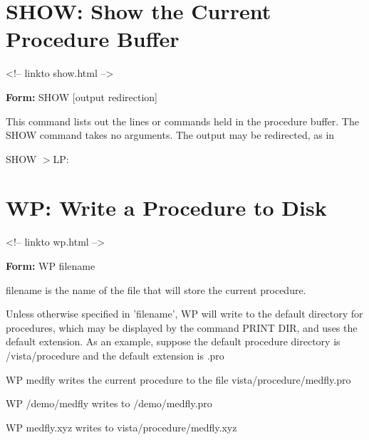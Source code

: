 \section{SHOW: Show the Current Procedure Buffer}
\begin{rawhtml}
<!-- linkto show.html -->
\end{rawhtml}

\begin{command}
  \item[\textbf{Form: } SHOW {[output redirection]}\hfill]{}
\end{command}

This command lists out the lines or commands held in the procedure buffer.
The SHOW command takes no arguments.  The output may be redirected, as in
\begin{hanging}
  \item{SHOW $>$LP:}
\end{hanging}

\section{WP: Write a Procedure to Disk}
\begin{rawhtml}
<!-- linkto wp.html -->
\end{rawhtml}

\begin{command}
  \item[\textbf{Form: } WP filename\hfill]{}
  \item[filename]{is the name of the file that will store the current procedure.}
\end{command}

Unless otherwise specified in 'filename', WP will write to the default
directory for procedures, which may be displayed by the command PRINT DIR,
and uses the default extension.  As an example, suppose the default
procedure directory is /vista/procedure and the default extension is .pro

\begin{example}
  \item[WP medfly\hfill]{writes the current procedure to the file
       vista/procedure/medfly.pro}
  \item[WP /demo/medfly\hfill]{writes to /demo/medfly.pro}
  \item[WP medfly.xyz\hfill]{writes to vista/procedure/medfly.xyz}
\end{example}

